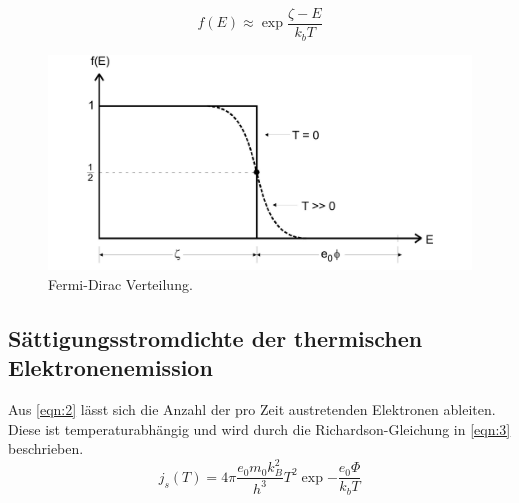 \begin{equation}
    \label{eqn:2}
    f\left(E\right) \approx \exp{\frac{\zeta-E}{k_b T}}
\end{equation}
\begin{figure}[H]
    \centering
        \centering
        \includegraphics[width=\textwidth]{Bilder/Fermi-Dirac.jpg}
        \caption{Fermi-Dirac Verteilung. \cite{anleitung4}}
    \hfill
    \label{fig:fermi}
\end{figure}

\subsection{Sättigungsstromdichte der thermischen Elektronenemission}
Aus \autoref{eqn:2} lässt sich die Anzahl der pro Zeit austretenden Elektronen
ableiten. Diese ist temperaturabhängig und wird durch die Richardson-Gleichung
in \autoref{eqn:3} beschrieben.
\begin{equation}
    \label{eqn:3}
    j_s \left(T\right) = 4\pi \frac{e_0m_0k_B^2}{h^3}T^2\exp{-\frac{e_0\Phi}{k_b T}}
\end{equation}

